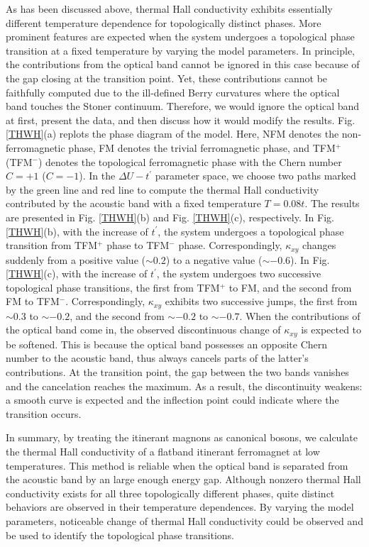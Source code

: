 \documentclass[amsmath,superscriptaddress,showpacs,aps,prl,onecolumn,notitlepage]{revtex4-1}
\begin{document}
\par As has been discussed above, thermal Hall conductivity exhibits essentially different temperature dependence for topologically distinct phases. More prominent features are expected when the system undergoes a topological phase transition at a fixed temperature by varying the model parameters. In principle, the contributions from the optical band cannot be ignored in this case because of the gap closing at the transition point. Yet, these contributions cannot be faithfully computed due to the ill-defined Berry curvatures where the optical band touches the Stoner continuum. Therefore, we would ignore the optical band at first, present the data, and then discuss how it would modify the results. Fig. \ref{THWH}(a) replots the phase diagram of the model. Here, NFM denotes the non-ferromagnetic phase, FM denotes the trivial ferromagnetic phase, and TFM$^+$ (TFM$^-$) denotes the topological ferromagnetic phase with the Chern number $C=+1$ ($C=-1$). In the $\Delta U-t^\prime$ parameter space, we choose two paths marked by the green line and red line to compute the thermal Hall conductivity contributed by the acoustic band with a fixed temperature $T=0.08t$. The results are presented in Fig. \ref{THWH}(b) and Fig. \ref{THWH}(c), respectively. In Fig. \ref{THWH}(b), with the increase of $t^\prime$, the system undergoes a topological phase transition from TFM$^+$ phase to TFM$^-$ phase. Correspondingly, $\kappa_{xy}$ changes suddenly from a positive value ($\sim0.2$) to a negative value ($\sim-0.6$). In Fig. \ref{THWH}(c), with the increase of $t^\prime$, the system undergoes two successive topological phase transitions, the first from TFM$^+$ to FM, and the second from FM to TFM$^-$. Correspondingly, $\kappa_{xy}$ exhibits two successive jumps, the first from $\sim0.3$ to $\sim-0.2$, and the second from $\sim-0.2$ to $\sim-0.7$. When the contributions of the optical band come in, the observed discontinuous change of $\kappa_{xy}$ is expected to be softened. This is because the optical band possesses an opposite Chern number to the acoustic band, thus always cancels parts of the latter's contributions. At the transition point, the gap between the two bands vanishes and the cancelation reaches the maximum. As a result, the discontinuity weakens: a smooth curve is expected and the inflection point could indicate where the transition occurs.

\par In summary, by treating the itinerant magnons as canonical bosons, we calculate the thermal Hall conductivity of a flatband itinerant ferromagnet at low temperatures. This method is reliable when the optical band is separated from the acoustic band by an large enough energy gap. Although nonzero thermal Hall conductivity exists for all three topologically different phases, quite distinct behaviors are observed in their temperature dependences. By varying the model parameters, noticeable change of thermal Hall conductivity could be observed and be used to identify the topological phase transitions.
\end{document}
